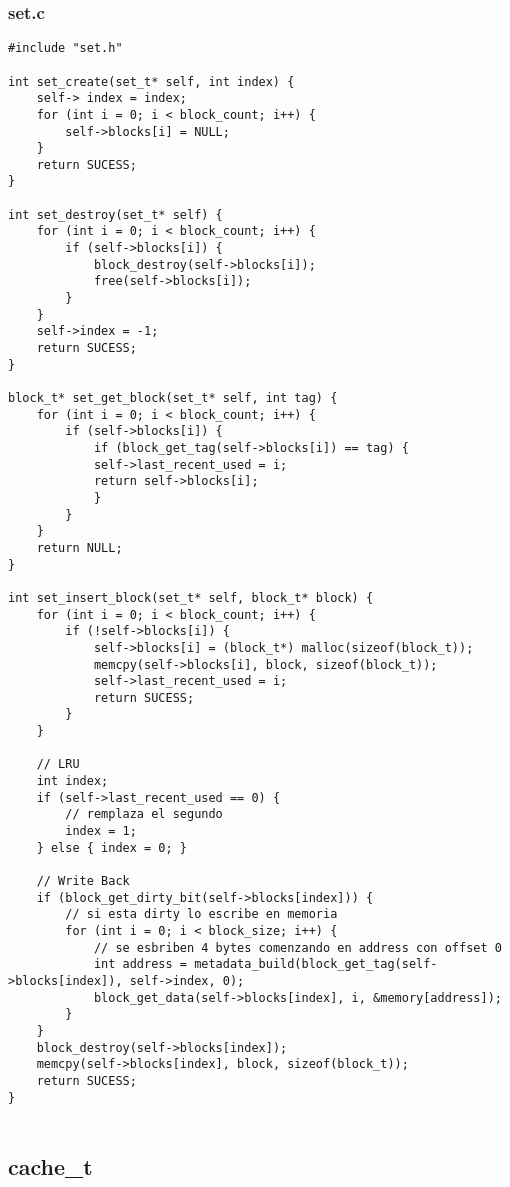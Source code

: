 \documentclass[a4paper,10pt]{article}
\begin{document}
  \subsubsection{set.c}
  \begin{verbatim}
#include "set.h"

int set_create(set_t* self, int index) {
	self-> index = index;
	for (int i = 0; i < block_count; i++) {
		self->blocks[i] = NULL;
	}
	return SUCESS;
}

int set_destroy(set_t* self) {
	for (int i = 0; i < block_count; i++) {
		if (self->blocks[i]) {
			block_destroy(self->blocks[i]);	
			free(self->blocks[i]);
		}
	}
	self->index = -1;
	return SUCESS;
}

block_t* set_get_block(set_t* self, int tag) {
	for (int i = 0; i < block_count; i++) {
		if (self->blocks[i]) {
			if (block_get_tag(self->blocks[i]) == tag) {
			self->last_recent_used = i;
			return self->blocks[i];
			}
		}
	}
	return NULL;
}

int set_insert_block(set_t* self, block_t* block) {
	for (int i = 0; i < block_count; i++) {
		if (!self->blocks[i]) {
			self->blocks[i] = (block_t*) malloc(sizeof(block_t));
			memcpy(self->blocks[i], block, sizeof(block_t));
			self->last_recent_used = i;
			return SUCESS;
		}
	}

	// LRU
	int index;
	if (self->last_recent_used == 0) {
		// remplaza el segundo
		index = 1;
	} else { index = 0; }

	// Write Back
	if (block_get_dirty_bit(self->blocks[index])) { 
		// si esta dirty lo escribe en memoria
		for (int i = 0; i < block_size; i++) {
			// se esbriben 4 bytes comenzando en address con offset 0 
			int address = metadata_build(block_get_tag(self->blocks[index]), self->index, 0);
			block_get_data(self->blocks[index], i, &memory[address]);
		}
	}
	block_destroy(self->blocks[index]);
	memcpy(self->blocks[index], block, sizeof(block_t));
	return SUCESS;
}
	
  \end{verbatim}
  
  \subsection{cache\_t}
\end{document}
